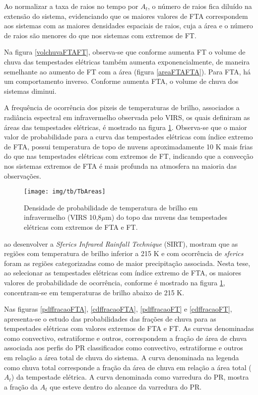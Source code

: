 Ao normalizar a taxa de raios no tempo por $A_t$, o número de raios fica diluído na extensão do sistema, evidenciando que os maiores valores de FTA correspondem aos sistemas com as maiores densidades espaciais de raios, cuja a área e o número de raios são menores do que nos sistemas com extremos de FT.

Na figura \ref{volchuvaFTAFT}, observa-se que conforme aumenta FT o volume de chuva das tempestades elétricas também aumenta exponencialmente, de maneira semelhante ao aumento de FT com a área (figura \ref{areaFTAFTA}). Para FTA, há um comportamento inverso. Conforme aumenta FTA, o volume de chuva dos sistemas diminui.  

A frequência de ocorrência dos pixeis de temperaturas de brilho, associados a radiância espectral em infravermelho observada pelo VIRS, os quais definiram as áreas das tempestades elétricas, é mostrado na figura \ref{tb}. Observa-se que o maior valor de probabilidade para a curva das tempestades elétricas com índice extremo de FTA, possui temperatura de topo de nuvens aproximadamente 10 K mais frias do que nas tempestades elétricas com extremos de FT, indicando que a convecção nos sistemas extremos de FTA é mais profunda na atmosfera na maioria das observações.

\begin{figure}[!ht]
  \centering 
  \texttt{[image: img/tb/TbAreas]}
  \caption{Densidade de probabilidade de temperatura de brilho em infravermelho (VIRS 10,8$\mu$m) do topo das nuvens das tempestades elétricas com extremos de FTA e FT.}
  \label{tb}
\end{figure}

 ao desenvolver a \textit{Sferics Infrared Rainfall Technique} (SIRT), mostram que as regiões com temperatura de brilho inferior a 215 K e com ocorrência de \textit{sferics} foram as regiões categorizadas como de maior precipitação associada. Nesta tese, ao selecionar as tempestades elétricas com índice extremo de FTA, os maiores valores de probabilidade de ocorrência, conforme é mostrado na figura \ref{tb}, concentram-se em temperaturas de brilho abaixo de 215 K.


Nas figuras \ref{pdffracaoFTA}, \ref{cdffracaoFTA}, \ref{pdffracaoFT} e  \ref{cdffracaoFT}, apresenta-se o estudo das probabilidades das frações de chuva para as tempestades elétricas com valores extremos de FTA e FT. As curvas denominadas como convectivo, estratiforme e outros, correspondem a fração de área de chuva associada aos perfis do PR classificados como convectivo, estratiforme e outros em relação a área total de chuva do sistema. A curva denominada na legenda como chuva total corresponde a fração da área de chuva em relação a área total ($A_t$) da tempestade elétrica. A curva denominada como varredura do PR, mostra a fração da $A_t$ que esteve dentro do alcance da varredura do PR.


